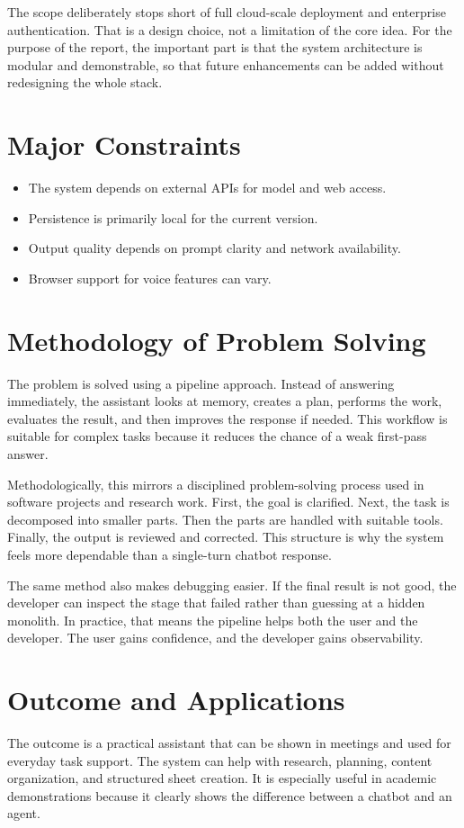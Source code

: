 \documentclass[11pt,oneside]{report}
\begin{document}
The scope deliberately stops short of full cloud-scale deployment and enterprise authentication. That is a design choice, not a limitation of the core idea. For the purpose of the report, the important part is that the system architecture is modular and demonstrable, so that future enhancements can be added without redesigning the whole stack.

\section{Major Constraints}
\begin{itemize}[leftmargin=1.2cm]
  \item The system depends on external APIs for model and web access.
  \item Persistence is primarily local for the current version.
  \item Output quality depends on prompt clarity and network availability.
  \item Browser support for voice features can vary.
\end{itemize}

\section{Methodology of Problem Solving}
The problem is solved using a pipeline approach. Instead of answering immediately, the assistant looks at memory, creates a plan, performs the work, evaluates the result, and then improves the response if needed. This workflow is suitable for complex tasks because it reduces the chance of a weak first-pass answer.

Methodologically, this mirrors a disciplined problem-solving process used in software projects and research work. First, the goal is clarified. Next, the task is decomposed into smaller parts. Then the parts are handled with suitable tools. Finally, the output is reviewed and corrected. This structure is why the system feels more dependable than a single-turn chatbot response.

The same method also makes debugging easier. If the final result is not good, the developer can inspect the stage that failed rather than guessing at a hidden monolith. In practice, that means the pipeline helps both the user and the developer. The user gains confidence, and the developer gains observability.

\section{Outcome and Applications}
The outcome is a practical assistant that can be shown in meetings and used for everyday task support. The system can help with research, planning, content organization, and structured sheet creation. It is especially useful in academic demonstrations because it clearly shows the difference between a chatbot and an agent.
\end{document}
